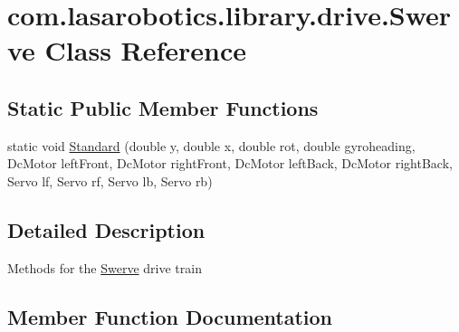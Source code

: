 \hypertarget{classcom_1_1lasarobotics_1_1library_1_1drive_1_1_swerve}{}\section{com.\+lasarobotics.\+library.\+drive.\+Swerve Class Reference}
\label{classcom_1_1lasarobotics_1_1library_1_1drive_1_1_swerve}
\subsection*{Static Public Member Functions}
\begin{DoxyCompactItemize}
\item 
static void \hyperlink{classcom_1_1lasarobotics_1_1library_1_1drive_1_1_swerve_a5fb0f43c7fbdfc9fef6a1f5af9848e0a}{Standard} (double y, double x, double rot, double gyroheading, Dc\+Motor left\+Front, Dc\+Motor right\+Front, Dc\+Motor left\+Back, Dc\+Motor right\+Back, Servo lf, Servo rf, Servo lb, Servo rb)
\end{DoxyCompactItemize}


\subsection{Detailed Description}
Methods for the \hyperlink{classcom_1_1lasarobotics_1_1library_1_1drive_1_1_swerve}{Swerve} drive train 

\subsection{Member Function Documentation}
\hypertarget{classcom_1_1lasarobotics_1_1library_1_1drive_1_1_swerve_a5fb0f43c7fbdfc9fef6a1f5af9848e0a}{}
